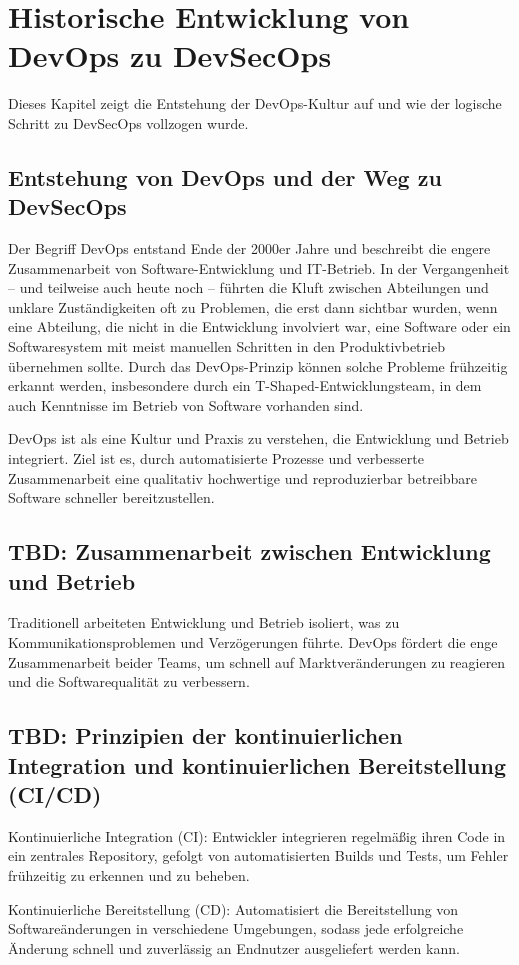 \section{Historische Entwicklung von DevOps zu DevSecOps}
Dieses Kapitel zeigt die Entstehung der DevOps-Kultur auf und wie der logische Schritt zu DevSecOps vollzogen wurde.

\subsection{Entstehung von DevOps und der Weg zu DevSecOps}
Der Begriff DevOps entstand Ende der 2000er Jahre und beschreibt die engere Zusammenarbeit von Software-Entwicklung und IT-Betrieb. In der Vergangenheit – und teilweise auch heute noch – führten die Kluft zwischen Abteilungen und unklare Zuständigkeiten oft zu Problemen, die erst dann sichtbar wurden, wenn eine Abteilung, die nicht in die Entwicklung involviert war, eine Software oder ein Softwaresystem mit meist manuellen Schritten in den Produktivbetrieb übernehmen sollte. Durch das DevOps-Prinzip können solche Probleme frühzeitig erkannt werden, insbesondere durch ein T-Shaped-Entwicklungsteam, in dem auch Kenntnisse im Betrieb von Software vorhanden sind.

DevOps ist als eine Kultur und Praxis zu verstehen, die Entwicklung und Betrieb integriert. Ziel ist es, durch automatisierte Prozesse und verbesserte Zusammenarbeit eine qualitativ hochwertige und reproduzierbar betreibbare Software schneller bereitzustellen.

\subsection{TBD: Zusammenarbeit zwischen Entwicklung und Betrieb}
Traditionell arbeiteten Entwicklung und Betrieb isoliert, was zu Kommunikationsproblemen und Verzögerungen führte. DevOps fördert die enge Zusammenarbeit beider Teams, um schnell auf Marktveränderungen zu reagieren und die Softwarequalität zu verbessern.


\subsection{TBD: Prinzipien der kontinuierlichen Integration und kontinuierlichen Bereitstellung (CI/CD)}
Kontinuierliche Integration (CI): Entwickler integrieren regelmäßig ihren Code in ein zentrales Repository, gefolgt von automatisierten Builds und Tests, um Fehler frühzeitig zu erkennen und zu beheben.

Kontinuierliche Bereitstellung (CD): Automatisiert die Bereitstellung von Softwareänderungen in verschiedene Umgebungen, sodass jede erfolgreiche Änderung schnell und zuverlässig an Endnutzer ausgeliefert werden kann.

